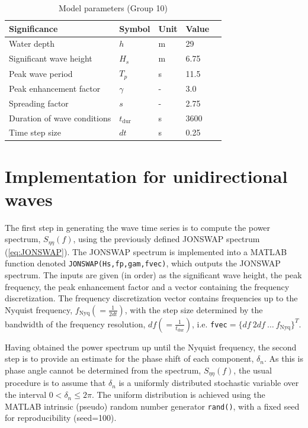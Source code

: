\begin{table}[h]
    \centering
    \caption{Model parameters (Group 10)}
    \begin{tabular}{@{}lllll@{}}
    \toprule
    Significance                            &   Symbol          & Unit       & Value \\ \hline
    Water depth                             &   $h$             & \si{m}     & 29   \\
    Significant wave height                 &   $H_{s}$         & \si{m}     & 6.75   \\
    Peak wave period                        &   $T_p$           & \si{s}     & 11.5  \\ \addlinespace[1mm]
    Peak enhancement factor                 &   $\gamma$        & \si{-}     & 3.0 \\ \addlinespace[1mm]
    Spreading factor                        &   $s$             & \si{-}     & 2.75   \\ \addlinespace[1mm]
    Duration of wave conditions             &   $t_{\text{dur}}$& \si{s}     & 3600   \\
    Time step size                          &   $dt$            & \si{s}     & 0.25   \\
    \bottomrule
    \end{tabular}
    \label{tab:Modelparameters}
\end{table}

\section{Implementation for unidirectional waves}

The first step in generating the wave time series is to compute the power spectrum, $S_{\eta \eta}(f)$, using the previously defined JONSWAP spectrum (\cref{eq:JONSWAP}). The JONSWAP spectrum is implemented into a MATLAB function denoted \verb+JONSWAP(Hs,fp,gam,fvec)+, which outputs the JONSWAP spectrum. The inputs are given (in order) as the significant wave height, the peak frequency, the peak enhancement factor and a vector containing the frequency discretization. The frequency discretization vector contains frequencies up to the Nyquist frequency, $f_{\text{Nyq}}(=\frac{1}{2dt})$, with the step size determined by the bandwidth of the frequency resolution, $df(=\frac{1}{t_{\text{dur}}})$, i.e. \verb+fvec+$=\{df\ 2df \ \dots \ f_{\text{Nyq}}\}^T$.

Having obtained the power spectrum up until the Nyquist frequency, the second step is to provide an estimate for the phase shift of each component, $\delta_n$. As this is phase angle cannot be determined from the spectrum, $S_{\eta \eta}(f)$, the usual procedure is to assume that $\delta_n$ is a uniformly distributed stochastic variable over the interval $0<\delta_n\leq 2\pi$. The uniform distribution is achieved using the MATLAB intrinsic (pseudo) random number generator \verb+rand()+, with a fixed seed for reproducibility (seed=100).

